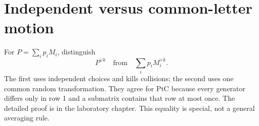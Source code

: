 \section{Independent versus common-letter motion}
For $P=\sum_i p_iM_i$, distinguish
\[
 P^{\vee k}\quad\text{from}\quad\sum_i p_iM_i^{\vee k}.
\]
The first uses independent choices and kills collisions; the second uses
one common random transformation. They agree for PtC because every
generator differs only in row 1 and a submatrix contains that row at most
once. The detailed proof is in the laboratory chapter. This equality is
special, not a general averaging rule.
